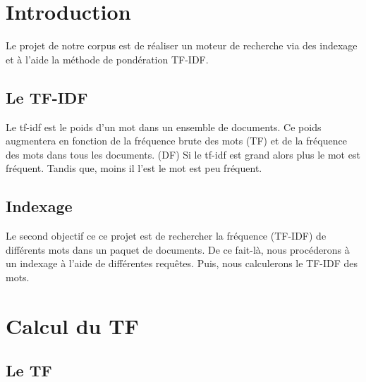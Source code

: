 \documentclass{article}
\begin{document}

\tableofcontents
\newpage

\section{Introduction}

Le projet de notre corpus est de réaliser un moteur de recherche via des indexage et à l'aide la méthode de pondération TF-IDF.



\subsection{Le TF-IDF}

Le tf-idf est le poids d'un mot dans un ensemble de documents. Ce poids augmentera en fonction de la fréquence brute des mots (TF) et de la fréquence des mots dans tous les documents. (DF)
Si le tf-idf est grand alors plus le mot est fréquent. Tandis que, moins il l'est le mot est peu fréquent.

\subsection{Indexage}

Le second objectif ce ce projet est de rechercher la fréquence (TF-IDF) de différents mots dans un paquet de documents. De ce fait-là, nous procéderons à un indexage à l'aide de différentes requêtes. Puis, nous calculerons le TF-IDF des mots.

\section{Calcul du TF}

\subsection{Le TF}
\end{document}
